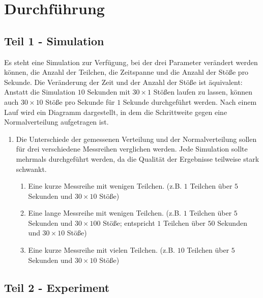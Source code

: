 \section*{Durchführung}

\subsection*{Teil 1 - Simulation}

Es steht eine Simulation zur Verfügung, bei der drei Parameter verändert werden können, die Anzahl der Teilchen, die Zeitspanne und die Anzahl der Stöße pro Sekunde. Die Veränderung der Zeit und der Anzahl der Stöße ist äquivalent: Anstatt die Simulation $10$ Sekunden mit $30\times1$ Stößen laufen zu lassen, können auch $30\times10$ Stöße pro Sekunde für $1$ Sekunde durchgeführt werden. Nach einem Lauf wird ein Diagramm dargestellt, in dem die Schrittweite gegen eine Normalverteilung aufgetragen ist.\\
\begin{enumerate}

    \item Die Unterschiede der gemessenen Verteilung und der Normalverteilung sollen für drei verschiedene Messreihen verglichen werden. Jede Simulation sollte mehrmals durchgeführt werden, da die Qualität der Ergebnisse teilweise stark schwankt.

    \begin{enumerate}

      \item Eine kurze Messreihe mit wenigen Teilchen. (z.B. $1$ Teilchen über $5$ Sekunden und $30\times10$ Stöße)

      \item Eine lange Messreihe mit wenigen Teilchen. (z.B. $1$ Teilchen über $5$ Sekunden und $30\times100$ Stöße; entspricht $1$ Teilchen über $50$ Sekunden und $30\times10$ Stöße)

      \item Eine kurze Messreihe mit vielen Teilchen. (z.B. $10$ Teilchen über $5$ Sekunden und $30\times10$ Stöße)

    \end{enumerate}

\end{enumerate}


\subsection*{Teil 2 - Experiment}

